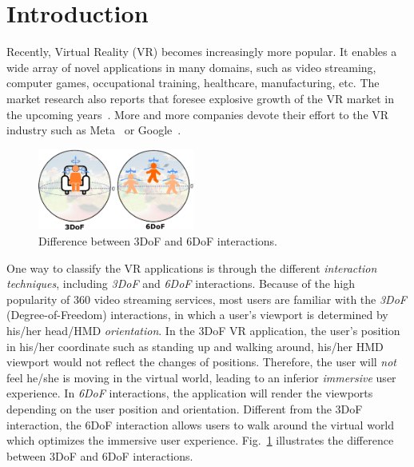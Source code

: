 \section{Introduction} \label{sec:intro}


Recently, Virtual Reality (VR) becomes increasingly more popular.
It enables a wide array of novel applications in many domains, such as video streaming, computer games, occupational training, healthcare, manufacturing, etc.
The market research also reports that foresee explosive growth of the VR market in the upcoming years~\cite{XR_market}.
More and more companies devote their effort to the VR industry such as Meta~\cite{meta} or Google~\cite{google_AR_VR, MJRD+20}.

\begin{figure}[tbh]
    \centering
    \includegraphics[width=0.46\textwidth]{figs/vr_phase.eps}
    \caption{Difference between 3DoF and 6DoF interactions.}
    \label{fig:vr_phase}
\end{figure}

One way to classify the VR applications is through the different {\em interaction techniques}, including {\em 3DoF} and {\em 6DoF} interactions.
Because of the high popularity of 360{\degree} video streaming services, most users are familiar with the {\em 3DoF} (Degree-of-Freedom) interactions, in which a user's viewport is determined by his/her head/HMD {\em orientation}.
In the 3DoF VR application, the user's position in his/her coordinate such as standing up and walking around, his/her HMD viewport would not reflect the changes of positions.
Therefore, the user will {\em not} feel he/she is moving in the virtual world, leading to an inferior {\em immersive} user experience.
In {\em 6DoF} interactions, the application will render the viewports depending on the user position and orientation. 
Different from the 3DoF interaction, the 6DoF interaction allows users to walk around the virtual world which optimizes the immersive user experience.
Fig.~\ref{fig:vr_phase} illustrates the difference between 3DoF and 6DoF interactions.

